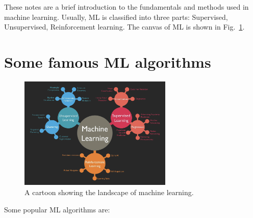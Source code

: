 \documentclass[11pt]{article}
\begin{document}
	These notes are a brief introduction to the fundamentals and methods used in machine learning. Usually, ML is 
	classified into three parts: Supervised, Unsupervised, Reinforcement learning. The canvas of ML is shown in Fig.~\ref{fig:EXP}. 
	
	
	
	
	\newpage
	\section{Some famous ML algorithms}
	
	
	

\begin{figure}
\centering 
\includegraphics[width=0.65\textwidth]{cartoonML.png}
\caption{\label{fig:EXP}A cartoon showing the landscape of machine learning.}
\end{figure}
	
	
Some popular ML algorithms are: 
\end{document}
